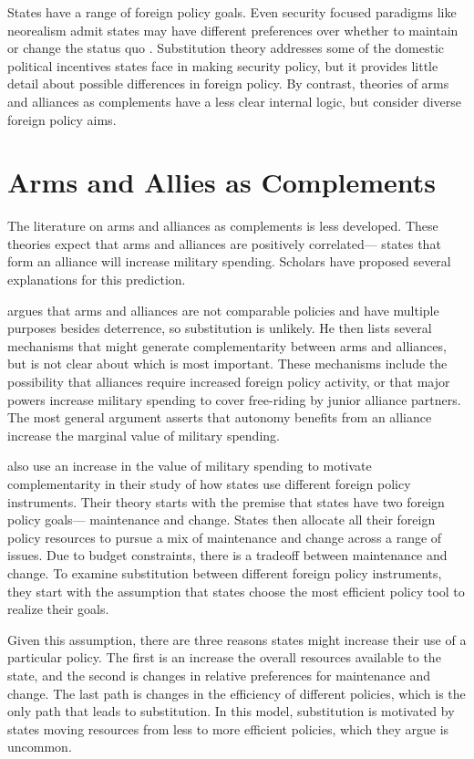 \documentclass[12pt]{article}
\begin{document}
States have a range of foreign policy goals. Even security focused paradigms like neorealism admit states may have different preferences over whether to maintain or change the status quo \citep{Schweller1994, Walt2009}. Substitution theory addresses some of the domestic political incentives states face in making security policy, but it provides little detail about possible differences in foreign policy. By contrast, theories of arms and alliances as complements have a less clear internal logic, but consider diverse foreign policy aims. 


\section*{Arms and Allies as Complements}

The literature on arms and alliances as complements is less developed. These theories expect that arms and alliances are positively correlated--- states that form an alliance will increase military spending. Scholars have proposed several explanations for this prediction.

\citet{Diehl1994} argues that arms and alliances are not comparable policies and have multiple purposes besides deterrence, so substitution is unlikely. He then lists several mechanisms that might generate complementarity between arms and alliances, but is not clear about which is most important. These mechanisms include the possibility that alliances require increased foreign policy activity, or that major powers increase military spending to cover free-riding by junior alliance partners. The most general argument asserts that autonomy benefits from an alliance increase the marginal value of military spending.

\citet{MorganPalmer2006} also use an increase in the value of military spending to motivate complementarity in their study of how states use different foreign policy instruments. Their theory starts with the premise that states have two foreign policy goals--- maintenance and change. States then allocate all their foreign policy resources to pursue a mix of maintenance and change across a range of issues. Due to budget constraints, there is a tradeoff between maintenance and change. To examine substitution between different foreign policy instruments, they start with the assumption that states choose the most efficient policy tool to realize their goals. 

Given this assumption, there are three reasons states might increase their use of a particular policy. The first is an increase the overall resources available to the state, and the second is changes in relative preferences for maintenance and change. The last path is changes in the efficiency of different policies, which is the only path that leads to substitution. In this model, substitution is motivated by states moving resources from less to more efficient policies, which they argue is uncommon. 
\end{document}
